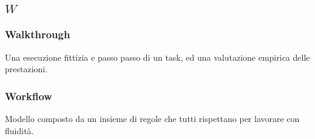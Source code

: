 \subsection*{\quad$W\quad$}
\subsubsection*{Walkthrough}
Una esecuzione fittizia e passo
passo di un task, ed una valutazione empirica delle
prestazioni. 
\subsubsection*{Workflow}
Modello composto da un insieme di regole che tutti rispettano per lavorare con fluidità.

